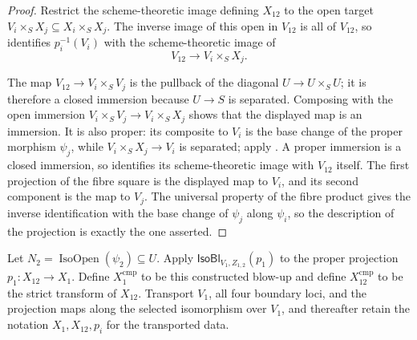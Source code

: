 \begin{proof}
  Restrict the scheme-theoretic image defining \(X_{12}\) to the open target
  \(V_i\times_SX_j\subseteq X_i\times_SX_j\).  The inverse image of this
  open in \(V_{12}\) is all of \(V_{12}\), so
   identifies
  \(p_i^{-1}(V_i)\) with the scheme-theoretic image of
  \[
    V_{12}\longrightarrow V_i\times_SX_j.
  \]

  The map \(V_{12}\to V_i\times_SV_j\) is the pullback of the diagonal
  \(U\to U\times_SU\); it is therefore a closed immersion because
  \(U\to S\) is separated.  Composing with the open immersion
  \(V_i\times_SV_j\to V_i\times_SX_j\) shows that the displayed map is an
  immersion.  It is also proper: its composite to \(V_i\) is the base change
  of the proper morphism \(\psi_j\), while
  \(V_i\times_SX_j\to V_i\) is separated; apply
  .  A proper immersion is a
  closed immersion, so
   identifies its
  scheme-theoretic image with \(V_{12}\) itself.
  The first projection of the fibre square is the displayed map to $V_i$,
  and its second component is the map to $V_j$.  The universal property of
  the fibre product gives the inverse identification with the base change of
  $\psi_j$ along $\psi_i$, so the description of the projection is exactly
  the one asserted.
\end{proof}

\begin{definition}
  \label{def:nagata-two-open-improved-comparison}

  Let $N_2=\operatorname{IsoOpen}(\psi_2)\subseteq U$.  Apply
  $\mathsf{IsoBl}_{V_1,Z_{1,2}}(p_1)$ to the proper projection
  $p_1\colon X_{12}\to X_1$.  Define $X_1^{\mathrm{cmp}}$ to be this
  constructed blow-up and define $X_{12}^{\mathrm{cmp}}$ to be the strict
  transform of $X_{12}$.  Transport $V_1$, all four boundary loci, and the
  projection maps along the selected isomorphism over $V_1$, and thereafter
  retain the notation $X_1,X_{12},p_i$ for the transported data.
\end{definition}

